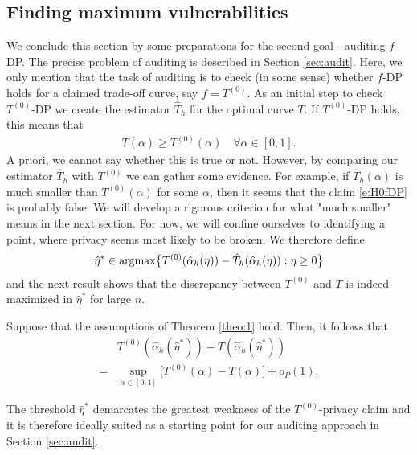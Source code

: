 \subsection{Finding maximum vulnerabilities} We conclude this section by some preparations for the second goal - auditing $f$-DP. The precise problem of auditing is described in Section \ref{sec:audit}. Here, we only mention that the task of auditing is to check (in some sense) whether $f$-DP holds for a claimed trade-off curve, say $f=T^{(0)}$.
As an initial step to check $T^{(0)}$-DP  we create the estimator $\hat T_h$ for the optimal curve $T$. If $T^{(0)}$-DP holds, this means that
\begin{align} \label{e:H0fDP}
     T(\alpha)\ge  T^{(0)}(\alpha)\quad \forall \alpha \in [0,1].
\end{align}
A priori, we cannot say whether this is true or not. However, by comparing our estimator $\hat T_h$ with  $T^{(0)}$ we can gather some evidence. For example, if $\hat T_h(\alpha)$ is much smaller than $ T^{(0)}(\alpha)$ for some $\alpha$, then it seems that the claim \eqref{e:H0fDP} is probably false. We will develop a rigorous criterion for what "much smaller" means in the next section. For now, we will confine ourselves to identifying a point, where privacy seems most likely to be broken. We therefore define 
\begin{align} \label{e:def:eta}
\hat \eta^* \in \textnormal{argmax} \big\{T^{(0)}(\hat \alpha_h(\eta))-\hat T_h(\hat \alpha_h(\eta)): \eta\ge 0\big\} 
\end{align}
and the next result shows that the discrepancy between $T^{(0)}$ and $T$ is indeed maximized in $\hat \eta^* $ for large $n$.\\
\begin{prop} \label{prop1}
    Suppose that the assumptions of Theorem \ref{theo:1} hold. Then, it follows that 
    \begin{align*}
    &T^{(0)}(\hat \alpha_h(\hat \eta^*)) - T(\hat \alpha_h(\hat \eta^*)) \\
    =&\sup_{\alpha \in [0,1]}\big[ T^{(0)}(\alpha)-T(\alpha)\big]+o_P(1).
    \end{align*}
\end{prop}
The threshold $\hat \eta^*$ demarcates the greatest weakness of the $T^{(0)}$-privacy claim and it is therefore ideally suited as a starting point for our auditing approach in Section \ref{sec:audit}.


